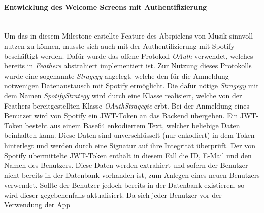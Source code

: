 \documentclass[10pt, a4paper]{article}
\begin{document}
\begin{onehalfspace}
\paragraph*{Entwicklung des Welcome Screens mit Authentifizierung} $~$ \\
Um das in diesem Milestone erstellte Feature des Abspielens von Musik sinnvoll nutzen zu können, musste sich auch mit der Authentifizierung mit Spotify beschäftigt
werden. Dafür wurde das offene Protokoll \textit{OAuth} verwendet, welches bereits in \textit{Feathers} abstrahiert implementiert ist. Zur Nutzung dieses
Protokolls wurde eine sogenannte \textit{Stragegy} angelegt, welche den für die Anmeldung notwenigen Datenaustausch mit Spotify ermöglicht.
Die dafür nötige \textit{Stragegy} mit dem Namen \textit{SpotifyStrategy} wird durch eine Klasse realisiert, welche von der Feathers bereitgestellten Klasse
\textit{OAuthStragegie} erbt. Bei der Anmeldung eines Benutzer wird von Spotify ein JWT-Token an das Backend übergeben. Ein JWT-Token besteht aus einem Base64
enkodiertem Text, welcher beliebige Daten beinhalten kann. Diese Daten sind unverschlüsselt (nur enkodiert) in dem Token hinterlegt und werden
durch eine Signatur auf ihre Integrität überprüft. Der von Spotify übermittelte JWT-Token enthält in diesem Fall die ID, E-Mail und den Namen des
Benutzers. Diese Daten werden extrahiert und sofern der Benutzer nicht bereits in der Datenbank vorhanden ist, zum Anlegen eines neuen Benutzers verwendet.
Sollte der Benutzer jedoch bereits in der Datenbank existieren, so wird dieser gegebenenfalls aktualisiert. Da sich jeder Benutzer vor der Verwendung der App

\end{onehalfspace}
\end{document}

